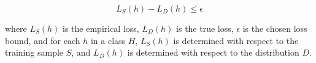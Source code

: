 \documentclass{article}
\begin{document}
\begin{equation}
    L_S (h) - L_D (h) \leq \epsilon
\end{equation}

where $L_S(h)$ is the empirical loss, $L_D(h)$ is the true loss, $\epsilon$ is the chosen loss bound, and for each $h$ in a class $H$, $L_S(h)$ is determined with respect to the training sample $S$, and $L_D(h)$ is determined with respect to the distribution $D$.
\end{document}
